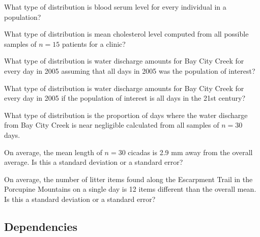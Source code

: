 \documentclass[10pt,openany]{book}\usepackage[]{graphicx}\usepackage[]{color}
\begin{document}
\vspace{-12pt}


\begin{exsection}
  \item \label{revex:SamplingDistBS} What type of distribution is blood serum level for every individual in a population? 
  \item \label{revex:SamplingDistCL} What type of distribution is mean cholesterol level computed from all possible samples of $n=15$ patients for a clinic?  
  \item \label{revex:SamplingDistWD1} What type of distribution is water discharge amounts for Bay City Creek for every day in 2005 assuming that all days in 2005 was the population of interest? 
  \item \label{revex:SamplingDistWD2} What type of distribution is water discharge amounts for Bay City Creek for every day in 2005 if the population of interest is all days in the 21st century? 
  \item \label{revex:SamplingDistWD3} What type of distribution is the proportion of days where the water discharge from Bay City Creek is near negligible calculated from all samples of $n=30$ days. 
  \item \label{revex:SamplingDistC} On average, the mean length of $n=30$ cicadas is 2.9 mm away from the overall average.  Is this a standard deviation or a standard error? 
  \item \label{revex:SamplingDistET} On average, the number of litter items found along the Escarpment Trail in the Porcupine Mountains on a single day is 12 items different than the overall mean.  Is this a standard deviation or a standard error? 
\end{exsection}


\vspace{-18pt}
\subsection{Dependencies}
\vspace{-12pt}
\end{document}
